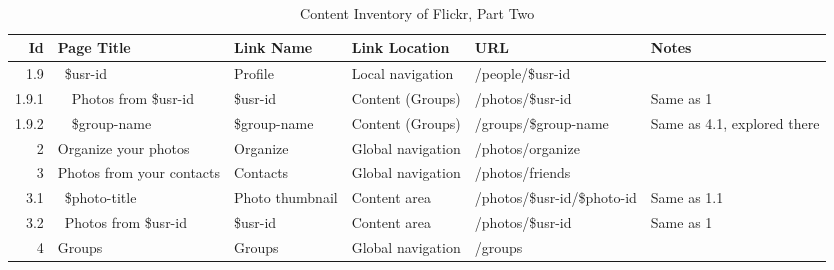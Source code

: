\documentclass[12pt,a4paper]{article}
\begin{document}
\begin{landscape}
  \begin{table}[h!b!p!]
    \caption{Content Inventory of Flickr, Part Two}
    \label{table:content.inventory.flickr.2}
    \begin{center}
      \begin{tiny}
        \tt
        \begin{tabular}{r|l|l|l|l|p{3cm}}
            Id &
            Page Title &
            Link Name &
            Link Location &
            URL &
            Notes \\

            \hline

              1.9 &
              ~\$usr-id &
              Profile &
              Local navigation &
              /people/\$usr-id &
              \\

                1.9.1 &
                ~~Photos from \$usr-id &
                \$usr-id &
                Content (Groups) &
                /photos/\$usr-id &
                Same as 1 \\

                1.9.2 &
                ~~\$group-name &
                \$group-name &
                Content (Groups) &
                /groups/\$group-name &
                Same as 4.1, explored there \\

            2 &
            Organize your photos &
            Organize &
            Global navigation &
            /photos/organize &
            \\

            3 &
            Photos from your contacts &
            Contacts &
            Global navigation &
            /photos/friends &
            \\

              3.1 &
              ~\$photo-title &
              Photo thumbnail &
              Content area &
              /photos/\$usr-id/\$photo-id &
              Same as 1.1 \\

              3.2 &
              ~Photos from \$usr-id &
              \$usr-id &
              Content area &
              /photos/\$usr-id &
              Same as 1 \\

            4 &
            Groups &
            Groups &
            Global navigation &
            /groups &
            \\


\end{tabular}
\end{tiny}
\end{center}
\end{table}
\end{landscape}
\end{document}
